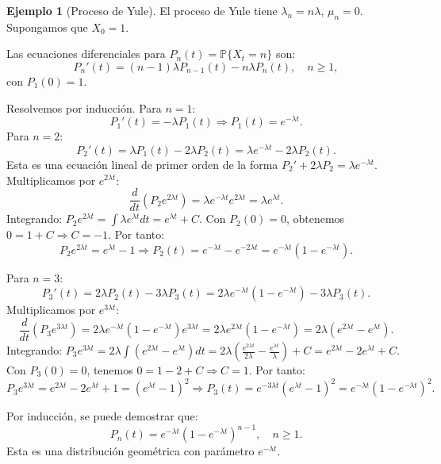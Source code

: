 \documentclass{article}
\theoremstyle{plain}
\theoremstyle{definition}
\newtheorem{Ejemplo}[Teorema]{Ejemplo}
\newcommand{\Prob}{\mathbb{P}}
\begin{document}
\begin{Ejemplo}[Proceso de Yule]
  El proceso de Yule tiene $\lambda_n = n\lambda$, $\mu_n = 0$. Supongamos que $X_0 = 1$.
  
  Las ecuaciones diferenciales para $P_n(t) = \Prob\{X_t = n\}$ son:
  \[ P_n'(t) = (n-1)\lambda P_{n-1}(t) - n\lambda P_n(t), \quad n \geq 1, \]
  con $P_1(0) = 1$.
  
  Resolvemos por inducci\'on. Para $n=1$:
  \[ P_1'(t) = -\lambda P_1(t) \Rightarrow P_1(t) = e^{-\lambda t}. \]
  Para $n=2$:
  \[ P_2'(t) = \lambda P_1(t) - 2\lambda P_2(t) = \lambda e^{-\lambda t} - 2\lambda P_2(t). \]
  Esta es una ecuaci\'on lineal de primer orden de la forma $P_2' + 2\lambda P_2 = \lambda e^{-\lambda t}$. Multiplicamos por $e^{2\lambda t}$:
  \[ \frac{d}{dt}(P_2 e^{2\lambda t}) = \lambda e^{-\lambda t} e^{2\lambda t} = \lambda e^{\lambda t}. \]
  Integrando: $P_2 e^{2\lambda t} = \int \lambda e^{\lambda t} dt = e^{\lambda t} + C$. Con $P_2(0)=0$, obtenemos $0 = 1 + C \Rightarrow C = -1$. Por tanto:
  \[ P_2 e^{2\lambda t} = e^{\lambda t} - 1 \Rightarrow P_2(t) = e^{-\lambda t} - e^{-2\lambda t} = e^{-\lambda t}(1 - e^{-\lambda t}). \]
  
  Para $n=3$:
  \[ P_3'(t) = 2\lambda P_2(t) - 3\lambda P_3(t) = 2\lambda e^{-\lambda t}(1 - e^{-\lambda t}) - 3\lambda P_3(t). \]
  Multiplicamos por $e^{3\lambda t}$:
  \[ \frac{d}{dt}(P_3 e^{3\lambda t}) = 2\lambda e^{-\lambda t}(1 - e^{-\lambda t}) e^{3\lambda t} = 2\lambda e^{2\lambda t}(1 - e^{-\lambda t}) = 2\lambda(e^{2\lambda t} - e^{\lambda t}). \]
  Integrando: $P_3 e^{3\lambda t} = 2\lambda \int (e^{2\lambda t} - e^{\lambda t}) dt = 2\lambda \left(\frac{e^{2\lambda t}}{2\lambda} - \frac{e^{\lambda t}}{\lambda}\right) + C = e^{2\lambda t} - 2e^{\lambda t} + C$.
  Con $P_3(0)=0$, tenemos $0 = 1 - 2 + C \Rightarrow C = 1$. Por tanto:
  \[ P_3 e^{3\lambda t} = e^{2\lambda t} - 2e^{\lambda t} + 1 = (e^{\lambda t} - 1)^2 \Rightarrow P_3(t) = e^{-3\lambda t}(e^{\lambda t} - 1)^2 = e^{-\lambda t}(1 - e^{-\lambda t})^2. \]
  
  Por inducci\'on, se puede demostrar que:
  \[ P_n(t) = e^{-\lambda t}(1 - e^{-\lambda t})^{n-1}, \quad n \geq 1. \]
  Esta es una distribuci\'on geom\'etrica con par\'ametro $e^{-\lambda t}$.
  

\end{Ejemplo}
\end{document}
